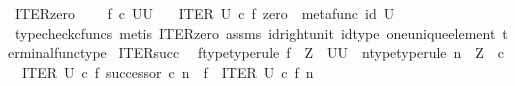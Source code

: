 \begin{isabellebody}
{\isafoldproof}%
%
\isadelimproof
\isanewline
%
\endisadelimproof
\isanewline
{}\isamarkupfalse%
\ ITER{\isacharunderscore}{\kern0pt}zero{\isacharprime}{\kern0pt}{\isacharcolon}{\kern0pt}\ \isanewline
\ \ \ {\isachardoublequoteopen}f\ {\isasymin}\isactrlsub c\ {\isacharparenleft}{\kern0pt}U\isactrlbsup U\isactrlesup {\isacharparenright}{\kern0pt}{\isachardoublequoteclose}\isanewline
\ \ \ {\isachardoublequoteopen}ITER\ U\ {\isasymcirc}\isactrlsub c\ {\isasymlangle}f{\isacharcomma}{\kern0pt}\ zero{\isasymrangle}\ {\isacharequal}{\kern0pt}\ metafunc\ {\isacharparenleft}{\kern0pt}id\ U{\isacharparenright}{\kern0pt}{\isachardoublequoteclose}\isanewline
%
\isadelimproof
\ \ %
\endisadelimproof
%
\isatagproof
{}\isamarkupfalse%
\ {\isacharparenleft}{\kern0pt}typecheck{\isacharunderscore}{\kern0pt}cfuncs{\isacharcomma}{\kern0pt}\ metis\ ITER{\isacharunderscore}{\kern0pt}zero\ assms\ id{\isacharunderscore}{\kern0pt}right{\isacharunderscore}{\kern0pt}unit{}\ id{\isacharunderscore}{\kern0pt}type\ one{\isacharunderscore}{\kern0pt}unique{\isacharunderscore}{\kern0pt}element\ terminal{\isacharunderscore}{\kern0pt}func{\isacharunderscore}{\kern0pt}type{\isacharparenright}{\kern0pt}%
\endisatagproof
{\isafoldproof}%
%
\isadelimproof
\isanewline
%
\endisadelimproof
\isanewline
{}\isamarkupfalse%
\ ITER{\isacharunderscore}{\kern0pt}succ{\isacharcolon}{\kern0pt}\isanewline
\ \ f{\isacharunderscore}{\kern0pt}type{\isacharbrackleft}{\kern0pt}type{\isacharunderscore}{\kern0pt}rule{\isacharbrackright}{\kern0pt}{\isacharcolon}{\kern0pt}\ {\isachardoublequoteopen}f\ {\isacharcolon}{\kern0pt}\ Z\ {\isasymrightarrow}\ {\isacharparenleft}{\kern0pt}U\isactrlbsup U\isactrlesup {\isacharparenright}{\kern0pt}{\isachardoublequoteclose}\ \ n{\isacharunderscore}{\kern0pt}type{\isacharbrackleft}{\kern0pt}type{\isacharunderscore}{\kern0pt}rule{\isacharbrackright}{\kern0pt}{\isacharcolon}{\kern0pt}\ {\isachardoublequoteopen}n\ {\isacharcolon}{\kern0pt}\ Z\ {\isasymrightarrow}\ {\isasymnat}\isactrlsub c{\isachardoublequoteclose}\isanewline
\ \ {\isachardoublequoteopen}ITER\ U\ {\isasymcirc}\isactrlsub c\ {\isasymlangle}f{\isacharcomma}{\kern0pt}\ successor\ {\isasymcirc}\isactrlsub c\ n{\isasymrangle}\ {\isacharequal}{\kern0pt}\ f\ {\isasymbox}\ {\isacharparenleft}{\kern0pt}ITER\ U\ {\isasymcirc}\isactrlsub c\ {\isasymlangle}f{\isacharcomma}{\kern0pt}\ n\ {\isasymrangle}{\isacharparenright}{\kern0pt}{\isachardoublequoteclose}\isanewline
%
\isadelimproof

\end{isabellebody}
